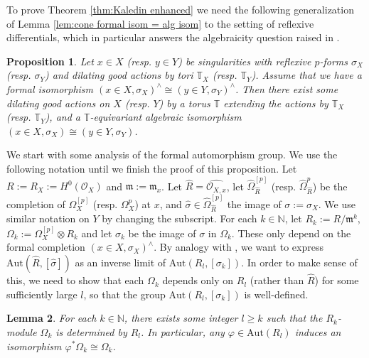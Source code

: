 \documentclass[12pt]{amsart}
\newtheorem{prop}{Proposition}[section]
\newtheorem{lem}[prop]{Lemma}
\theoremstyle{definition}
\newcommand{\bN}{\mathbb{N}}
\newcommand{\bT}{\mathbb{T}}
\newcommand{\cO}{\mathcal{O}}
\newcommand{\fm}{\mathfrak{m}}
\newcommand{\Aut}{\mathrm{Aut}}
\numberwithin{equation}{section}
\begin{document}
To prove Theorem \ref{thm:Kaledin enhanced} we need the following generalization of Lemma \ref{lem:cone formal isom = alg isom} to the setting of reflexive differentials, which in particular answers the algebraicity question raised in \cite[Page 3]{Namikawa-torichyperkahler}.

\begin{prop} \label{prop:cone+form formal isom = alg isom}
Let $x\in X$ (resp. $y\in Y$) be  singularities with reflexive $p$-forms $\sigma_X$ (resp. $\sigma_Y$) and dilating good actions by tori $\mathbb T_X$ (resp. $\mathbb T_Y$). Assume that we have a formal isomorphism $(x\in X,\sigma_X)^\wedge \cong (y\in Y,\sigma_Y)^\wedge$. Then there exist some dilating good actions on $X$ (resp. $Y$) by a torus $\mathbb T$ extending the actions by $\mathbb T_X$ (resp. $\mathbb T_Y$), and a $\bT$-equivariant algebraic isomorphism $(x\in X,\sigma_X)\cong (y\in Y,\sigma_Y)$.
\end{prop}

We start with some analysis of the formal automorphism group. We use the following notation until we finish the proof of this proposition. Let $R:=R_X:=H^0(\cO_X)$ and $\fm:=\fm_x$. Let $\widehat{R} = \widehat{\cO_{X,x}}$, let $\widehat{\Omega}_{\widehat{R}}^{[p]}$ (resp. $\widehat{\Omega}_{\widehat{R}}^p$) be the completion of $\Omega_X^{[p]}$ (resp. $\Omega_{X}^p$) at $x$, and $\widehat{\sigma}\in \widehat{\Omega}_{\widehat{R}}^{[p]}$ the image of $\sigma:=\sigma_X$. We use similar notation on $Y$ by changing the subscript. For each $k\in\bN$, let $R_k:=R/\fm^k$, $\Omega_k :=\Omega_{X}^{[p]}\otimes R_k$ and let $\sigma_k$ be the image of $\sigma$ in $\Omega_k$. These only depend on the formal completion $(x\in X,\sigma_X)^\wedge$. By analogy with \cite[8.4]{Kol-cone-auto}, we want to express $\Aut(\widehat{R},[\widehat{\sigma}])$ as an inverse limit of $\Aut(R_l,[\sigma_k])$. In order to make sense of this, we need to show that each $\Omega_k$ depends only on $R_l$ (rather than $\widehat{R}$) for some sufficiently large $l$, so that the group $\Aut(R_l,[\sigma_k])$ is well-defined.

\begin{lem} \label{lem:reflex diff finite level}
For each $k\in\bN$, there exists some integer $l\ge k$ such that the $R_k$-module $\Omega_k$ is determined by $R_l$. In particular, any $\varphi\in \Aut(R_l)$ induces an isomorphism $\varphi^*\Omega_k \cong \Omega_k$. 
\end{lem}
\end{document}
